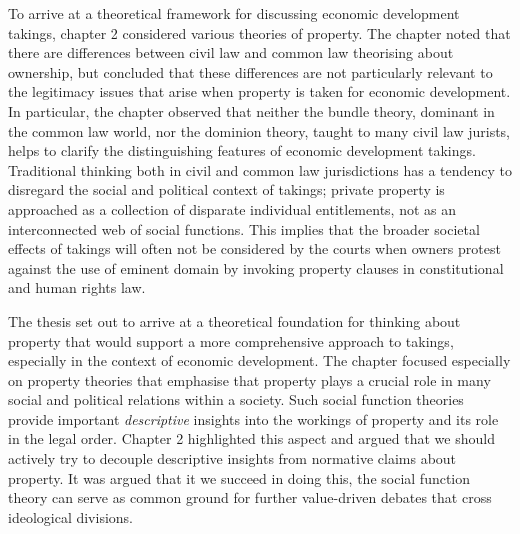 
To arrive at a theoretical framework for discussing economic development takings, chapter 2 considered various theories of property. The chapter noted that there are differences between civil law and common law theorising about ownership, but concluded that these differences are not particularly relevant to the legitimacy issues that arise when property is taken for economic development. In particular, the chapter observed that neither the bundle theory, dominant in the common law world, nor the dominion theory, taught to many civil law jurists, helps to clarify the distinguishing features of economic development takings. Traditional thinking both in civil and common law jurisdictions has a tendency to disregard the social and political context of takings; private property is approached as a collection of disparate individual entitlements, not as an interconnected web of social functions. This implies that the broader societal effects of takings will often not be considered by the courts when owners protest against the use of eminent domain by invoking property clauses in constitutional and human rights law.

The thesis set out to arrive at a theoretical foundation for thinking about property that would support a more comprehensive approach to takings, especially in the context of economic development. The chapter focused especially on property theories that emphasise that property plays a crucial role in many social and political relations within a society. Such social function theories provide important {\it descriptive} insights into the workings of property and its role in the legal order. Chapter 2 highlighted this aspect and argued that we should actively try to decouple descriptive insights from normative claims about property. It was argued that it we succeed in doing this, the social function theory can serve as common ground for further value-driven debates that cross ideological divisions.

